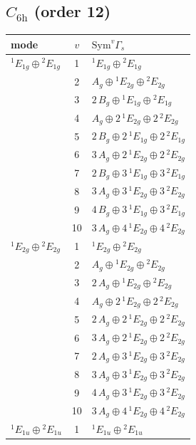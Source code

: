 \documentclass[11pt]{article}
\begin{document}
\subsection*{$C_{6\mathrm{h}}$ \quad (order 12)}
\begin{longtable}{l c p{}}
\hline mode & $v$ & $\mathrm{Sym}^v\Gamma_s$\\ \hline\endhead
${}^{1}E_{1g}\oplus {}^{2}E_{1g}$ & 1 & ${}^{1}E_{1g}\oplus {}^{2}E_{1g}$\\
 & 2 & $A_{g}\oplus {}^{1}E_{2g}\oplus {}^{2}E_{2g}$\\
 & 3 & $2\,B_{g}\oplus {}^{1}E_{1g}\oplus {}^{2}E_{1g}$\\
 & 4 & $A_{g}\oplus 2\,{}^{1}E_{2g}\oplus 2\,{}^{2}E_{2g}$\\
 & 5 & $2\,B_{g}\oplus 2\,{}^{1}E_{1g}\oplus 2\,{}^{2}E_{1g}$\\
 & 6 & $3\,A_{g}\oplus 2\,{}^{1}E_{2g}\oplus 2\,{}^{2}E_{2g}$\\
 & 7 & $2\,B_{g}\oplus 3\,{}^{1}E_{1g}\oplus 3\,{}^{2}E_{1g}$\\
 & 8 & $3\,A_{g}\oplus 3\,{}^{1}E_{2g}\oplus 3\,{}^{2}E_{2g}$\\
 & 9 & $4\,B_{g}\oplus 3\,{}^{1}E_{1g}\oplus 3\,{}^{2}E_{1g}$\\
 & 10 & $3\,A_{g}\oplus 4\,{}^{1}E_{2g}\oplus 4\,{}^{2}E_{2g}$\\
\hline
${}^{1}E_{2g}\oplus {}^{2}E_{2g}$ & 1 & ${}^{1}E_{2g}\oplus {}^{2}E_{2g}$\\
 & 2 & $A_{g}\oplus {}^{1}E_{2g}\oplus {}^{2}E_{2g}$\\
 & 3 & $2\,A_{g}\oplus {}^{1}E_{2g}\oplus {}^{2}E_{2g}$\\
 & 4 & $A_{g}\oplus 2\,{}^{1}E_{2g}\oplus 2\,{}^{2}E_{2g}$\\
 & 5 & $2\,A_{g}\oplus 2\,{}^{1}E_{2g}\oplus 2\,{}^{2}E_{2g}$\\
 & 6 & $3\,A_{g}\oplus 2\,{}^{1}E_{2g}\oplus 2\,{}^{2}E_{2g}$\\
 & 7 & $2\,A_{g}\oplus 3\,{}^{1}E_{2g}\oplus 3\,{}^{2}E_{2g}$\\
 & 8 & $3\,A_{g}\oplus 3\,{}^{1}E_{2g}\oplus 3\,{}^{2}E_{2g}$\\
 & 9 & $4\,A_{g}\oplus 3\,{}^{1}E_{2g}\oplus 3\,{}^{2}E_{2g}$\\
 & 10 & $3\,A_{g}\oplus 4\,{}^{1}E_{2g}\oplus 4\,{}^{2}E_{2g}$\\
\hline
${}^{1}E_{1u}\oplus {}^{2}E_{1u}$ & 1 & ${}^{1}E_{1u}\oplus {}^{2}E_{1u}$\\

\end{longtable}
\end{document}
